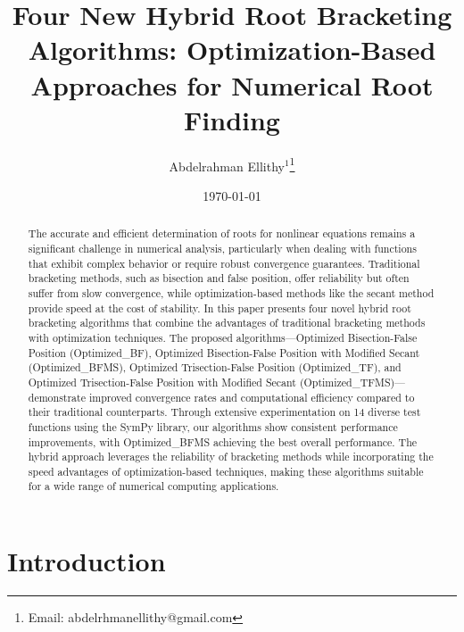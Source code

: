 \documentclass[amsmath, amssymb, aps]{revtex4-2}
\begin{document}
\pagestyle{plain}


\title{Four New Hybrid Root Bracketing Algorithms: Optimization-Based Approaches for Numerical Root Finding}

\author{Abdelrahman Ellithy$^{1}$\thanks{Email: abdelrhmanellithy@gmail.com}}

\date{\today}

\begin{abstract}
The accurate and efficient determination of roots for nonlinear equations remains a significant challenge in numerical analysis, particularly when dealing with functions that exhibit complex behavior or require robust convergence guarantees. Traditional bracketing methods, such as bisection and false position, offer reliability but often suffer from slow convergence, while optimization-based methods like the secant method provide speed at the cost of stability. In this paper presents four novel hybrid root bracketing algorithms that combine the advantages of traditional bracketing methods with optimization techniques. The proposed algorithms—Optimized Bisection-False Position (Optimized\_BF), Optimized Bisection-False Position with Modified Secant (Optimized\_BFMS), Optimized Trisection-False Position (Optimized\_TF), and Optimized Trisection-False Position with Modified Secant (Optimized\_TFMS)—demonstrate improved convergence rates and computational efficiency compared to their traditional counterparts. Through extensive experimentation on 14 diverse test functions using the SymPy library, our algorithms show consistent performance improvements, with Optimized\_BFMS achieving the best overall performance. The hybrid approach leverages the reliability of bracketing methods while incorporating the speed advantages of optimization-based techniques, making these algorithms suitable for a wide range of numerical computing applications.
\end{abstract}


\maketitle

\section{Introduction}
\end{document}
